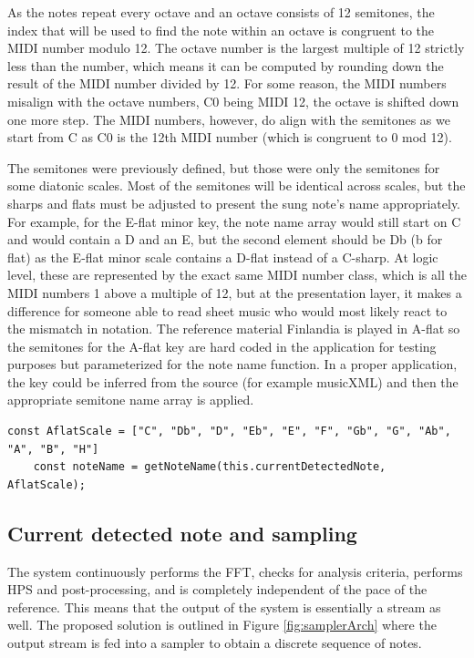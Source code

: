 As the notes repeat every octave and an octave consists of 12 semitones, the index that will be used to find the note within an octave is congruent to the MIDI number modulo 12. The octave number is the largest multiple of 12 strictly less than the number, which means it can be computed by rounding down the result of the MIDI number divided by 12. For some reason, the MIDI numbers misalign with the octave numbers, C0 being MIDI 12, the octave is shifted down one more step. The MIDI numbers, however, do align with the semitones as we start from C as C0 is the 12th MIDI number (which is congruent to 0 mod 12).



The semitones were previously defined, but those were only the semitones for some diatonic scales. Most of the semitones will be identical across scales, but the sharps and flats must be adjusted to present the sung note's name appropriately. For example, for the E-flat minor key, the note name array would still start on C and would contain a D and an E, but the second element should be Db (b for flat) as the E-flat minor scale contains a D-flat instead of a C-sharp. At logic level, these are represented by the exact same MIDI number class, which is all the MIDI numbers 1 above a multiple of 12, but at the presentation layer, it makes a difference for someone able to read sheet music who would most likely react to the mismatch in notation. The reference material Finlandia is played in A-flat so the semitones for the A-flat key are hard coded in the application for testing purposes but parameterized for the note name function. In a proper application, the key could be inferred from the source (for example musicXML) and then the appropriate semitone name array is applied.

\begin{lstlisting}[style=javascript]
    const AflatScale = ["C", "Db", "D", "Eb", "E", "F", "Gb", "G", "Ab", "A", "B", "H"]
    const noteName = getNoteName(this.currentDetectedNote, AflatScale);
\end{lstlisting}

\subsection{Current detected note and sampling}
The system continuously performs the FFT, checks for analysis criteria, performs HPS and post-processing, and is completely independent of the pace of the reference. This means that the output of the system is essentially a stream as well. The proposed solution is outlined in Figure \ref{fig:samplerArch} where the output stream is fed into a sampler to obtain a discrete sequence of notes. 

